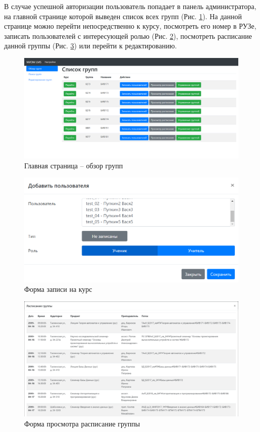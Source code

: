 \documentclass[a4paper,14pt]{article}
\begin{document}
В случае успешной авторизации пользователь попадает в панель администратора, на главной странице которой выведен список всех групп (Рис. \ref{img:ui_listOfGroups}).
На данной странице можно перейти непосредственно к курсу, посмотреть его номер в РУЗе, записать пользователей с интересующей ролью (Рис. \ref{img:ui_enroll}), посмотреть расписание данной группы (Рис. \ref{img:ui_scheduler}) или перейти к редактированию.

\begin{figure}[H]
	\centering
	\includegraphics[width=\linewidth]{image/ui_listOfGroups}
	\caption{Главная страница -- обзор групп}
	\label{img:ui_listOfGroups}
\end{figure}

\begin{figure}[H]
	\centering
	\includegraphics[width=\linewidth]{image/ui_enroll}
	\caption{Форма записи на курс}
	\label{img:ui_enroll}
\end{figure}
\begin{figure}[H]
	\centering
	\includegraphics[width=\linewidth]{image/ui_scheduler}
	\caption{Форма просмотра расписание группы}
	\label{img:ui_scheduler}
\end{figure}
\end{document}

